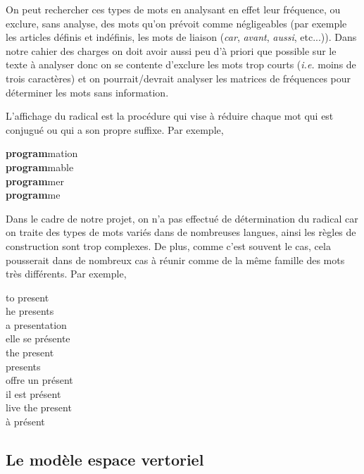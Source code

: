 On peut rechercher ces types de mots en analysant en effet
leur fréquence, ou exclure, sans analyse, des mots qu'on prévoit
comme négligeables (par exemple les articles définis et indéfinis,
les mots de liaison ({\it car}, {\it avant}, {\it aussi}, etc...)).
Dans notre cahier des charges on doit avoir aussi peu d'à priori
que possible sur le texte à analyser donc on se contente d'exclure
les mots trop courts ({\it i.e.} moins de trois caractères)
et on pourrait/devrait analyser les matrices de fréquences pour
déterminer les mots sans information.

L'affichage du radical est la procédure qui vise à réduire
chaque mot qui est conjugué ou qui a son propre suffixe.
Par exemple,

\begin{center}
{\bf program}mation \\
{\bf program}mable  \\
{\bf program}mer    \\
{\bf program}me     \\
\end{center}

Dans le cadre de notre projet, on n'a pas effectué
de détermination du radical car on traite des types
de mots variés dans de nombreuses langues,
ainsi les règles de construction sont trop complexes.
De plus, comme c'est souvent le cas, cela pousserait
dans de nombreux cas à réunir comme de la même famille
des mots très différents. Par exemple,

\begin{center}
\begin{multicols}{3}
to present \\
he presents \\
a presentation \\
elle se présente \\
\columnbreak
the present \\
presents \\
offre un présent \\
\columnbreak
il est présent \\
live the present \\
à présent
\end{multicols}
\end{center}

\subsection{Le modèle espace vertoriel}

